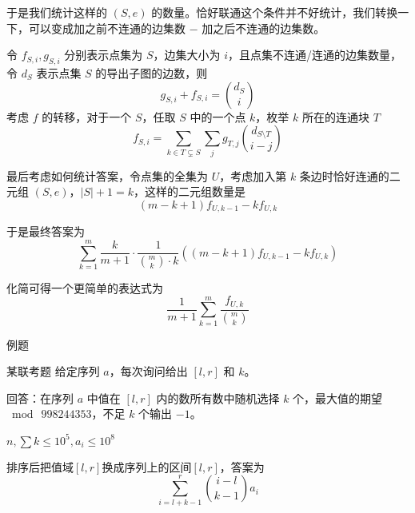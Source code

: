 \documentclass[UTF8]{beamer}
\begin{document}
    \begin{frame}
        于是我们统计这样的 $(S,e)$ 的数量。恰好联通这个条件并不好统计，我们转换一下，可以变成加之前不连通的边集数 $-$ 加之后不连通的边集数。

        令 $f_{S,i},g_{S,i}$ 分别表示点集为 $S$，边集大小为 $i$，且点集不连通/连通的边集数量，令 $d_S$ 表示点集 $S$ 的导出子图的边数，则
        $$
        g_{S,i}+f_{S,i} = \binom{d_S}{i}
        $$
        考虑 $f$ 的转移，对于一个 $S$，任取 $S$ 中的一个点 $k$，枚举 $k$ 所在的连通块 $T$
        $$
        f_{S,i} = \sum_{k\in T\subsetneq S}\sum_{j} g_{T,j}\binom{d_{S\setminus T}}{i-j}
        $$
    \end{frame}

    \begin{frame}
        最后考虑如何统计答案，令点集的全集为 $U$，考虑加入第 $k$ 条边时恰好连通的二元组 $(S,e)$，$|S|+1=k$，这样的二元组数量是
        $$
        (m-k+1)f_{U,k-1}-kf_{U,k}
        $$

        于是最终答案为
        $$
        \sum_{k=1}^m\frac{k}{m+1}\cdot\frac{1}{\binom{m}{k}\cdot k}((m-k+1)f_{U,k-1}-kf_{U,k})
        $$

        化简可得一个更简单的表达式为
        $$
        \frac{1}{m+1}\sum_{k=1}^m\frac{f_{U,k}}{\binom{m}{k}}
        $$

    \end{frame}

    \begin{frame}{例题}
        \begin{block}{某联考题}
            给定序列 $a$，每次询问给出 $[l,r]$ 和 $k$。
            
            回答：在序列 $a$ 中值在 $[l,r]$ 内的数所有数中随机选择 $k$ 个，最大值的期望$\bmod\  998244353$，不足 $k$ 个输出 $-1$。

            $n,\sum k\le 10^5,a_i\le 10^8$
        \end{block}

        \pause

        排序后把值域$[l,r]$换成序列上的区间$[l,r]$，答案为 
        $$
        \sum_{i=l+k-1}^r\binom{i-l}{k-1}a_i
        $$
    \end{frame}
\end{document}
